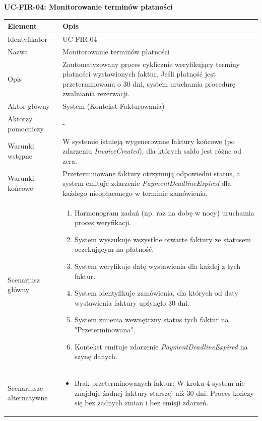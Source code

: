 \textbf{UC-FIR-04: Monitorowanie terminów płatności}

\begin{longtable}{|p{4cm}|p{11cm}|}
\hline
\textbf{Element} & \textbf{Opis} \\
\hline

Identyfikator & UC-FIR-04 \\
\hline

Nazwa & Monitorowanie terminów płatności \\
\hline

Opis & 
Zautomatyzowany proces cyklicznie weryfikujący terminy płatności wystawionych faktur. Jeśli płatność jest przeterminowana o 30 dni, system uruchamia procedurę zwalniania rezerwacji. \\
\hline

Aktor główny & System (Kontekst Fakturowania) \\
\hline

Aktorzy pomocniczy & - \\
\hline

Warunki wstępne & 
W systemie istnieją wygenerowane faktury końcowe (po zdarzeniu \textit{InvoiceCreated}), dla których saldo jest różne od zera. \\
\hline

Warunki końcowe & 
Przeterminowane faktury otrzymują odpowiedni status, a system emituje zdarzenie \textit{PaymentDeadlineExpired} dla każdego nieopłaconego w terminie zamówienia. \\
\hline

Scenariusz główny & 
\begin{enumerate}
    \item Harmonogram zadań (np. raz na dobę w nocy) uruchamia proces weryfikacji.
    \item System wyszukuje wszystkie otwarte faktury ze statusem oczekującym na płatność.
    \item System weryfikuje datę wystawienia dla każdej z tych faktur.
    \item System identyfikuje zamówienia, dla których od daty wystawienia faktury upłynęło 30 dni.
    \item System zmienia wewnętrzny status tych faktur na "Przeterminowana".
    \item Kontekst emituje zdarzenie \textit{PaymentDeadlineExpired} na szynę danych.
\end{enumerate} \\
\hline

Scenariusze alternatywne & 
\begin{itemize}
    \item [A1] Brak przeterminowanych faktur: W kroku 4 system nie znajduje żadnej faktury starszej niż 30 dni. Proces kończy się bez żadnych zmian i bez emisji zdarzeń.
\end{itemize} \\
\hline
\end{longtable}